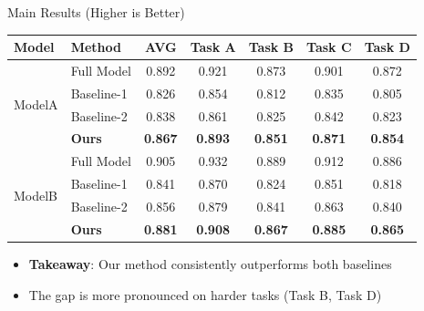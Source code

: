 \documentclass{beamer}
\begin{document}
\begin{frame}{Main Results (Higher is Better)}
    \centering
    \scriptsize
    \begin{tabular}{l|lccccc}
        \toprule
        \textbf{Model} & \textbf{Method} & \textbf{AVG} & \textbf{Task A} & \textbf{Task B} & \textbf{Task C} & \textbf{Task D} \\
        \midrule
        \multirow{4}{*}{ModelA}
        & Full Model   & 0.892 & 0.921 & 0.873 & 0.901 & 0.872 \\
        & Baseline-1   & 0.826 & 0.854 & 0.812 & 0.835 & 0.805 \\
        & Baseline-2   & 0.838 & 0.861 & 0.825 & 0.842 & 0.823 \\
        & \textbf{Ours} & \textbf{0.867} & \textbf{0.893} & \textbf{0.851} & \textbf{0.871} & \textbf{0.854} \\
        \midrule
        \multirow{4}{*}{ModelB}
        & Full Model   & 0.905 & 0.932 & 0.889 & 0.912 & 0.886 \\
        & Baseline-1   & 0.841 & 0.870 & 0.824 & 0.851 & 0.818 \\
        & Baseline-2   & 0.856 & 0.879 & 0.841 & 0.863 & 0.840 \\
        & \textbf{Ours} & \textbf{0.881} & \textbf{0.908} & \textbf{0.867} & \textbf{0.885} & \textbf{0.865} \\
        \bottomrule
    \end{tabular}

    \vspace{0.4cm}
    \normalsize
    \begin{itemize}
        \item \textcolor{ECNURed}{\textbf{Takeaway}}: Our method consistently outperforms both baselines
        \item The gap is more pronounced on harder tasks (Task B, Task D)
    \end{itemize}
\end{frame}
\end{document}
